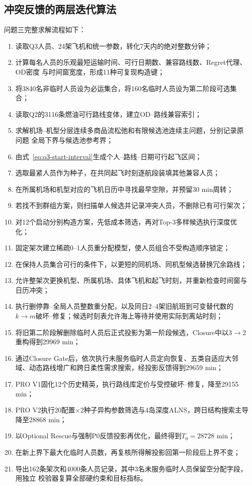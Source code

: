 \documentclass[UTF8,a4paper,zihao=5]{ctexart}
\begin{document}
\subsection{冲突反馈的两层迭代算法}

问题三完整求解流程如下：
\begin{enumerate}[label=\textbf{步骤\arabic*.},leftmargin=4.5em]
  \item 读取Q3人员、24架飞机和统一参数，转化7天内的绝对整数分钟；
  \item 计算每名人员的乐观最短运输时间、可行日期数、兼容路线数、Regret代理、OD密度
  与时间窗宽度，形成11种可复现构造键；
  \item 将3840名非临时人员设为必运集合，将160名临时人员设为第二阶段可选集合；
  \item 读取Q2的3116条燃油可行路线变体，建立OD--路线兼容索引；
  \item 求解机场--机型分层连续多商品流松弛和有限候选池连续主问题，分别记录原问题
  全局下界与候选池参考界；
  \item 由式~\eqref{eq:q3-start-interval}生成个人--路线--日期可行起飞区间；
  \item 选取最紧人员作为种子，在共同起飞时刻逐航段装填其他兼容人员；
  \item 在所属机场和机型对应的飞机日历中寻找最早空隙，并预留30 min周转；
  \item 若找不到群组方案，则扫描单人候选并记录冲突人员，不删除已有可行架次；
  \item 对12个启动分别构造方案，先低成本筛选，再对Top-$3$多样候选执行深度优化；
  \item 固定架次建立稀疏0--1人员重分配模型，使人员组合不受构造顺序锁定；
  \item 在保持人员集合可行的条件下，以更短的同机场、同机型候选替换冗余路线；
  \item 允许整架次更换机型、所属机场、具体飞机和起飞时刻，并重新检查时间窗与日历冲突；
  \item 执行删停靠--全局人员整数重分配，以及同日2--4架旧航班到可变替代数的
  $k\to m$破坏--修复；候选时刻表允许海上等待并使用实际到离站时刻；
  \item 将旧第二阶段解删除临时人员后正式投影为第一阶段候选，Closure中以$3\to2$重构得到29969 min；
  \item 通过Closure Gate后，依次执行未服务临时人员定向恢复、五类自适应大邻域、动态路线增广和跨日柔性需求搜索，经投影反馈得到29659 min；
  \item PRO V1固化12个历史精英，执行路线库定价与受控破坏--修复，降至29155 min；
  \item PRO V2执行20配置$\times$2种子异构参数筛选与4岛深度ALNS，跨日结构搜索主导降至28868 min；
  \item 以Optional Rescue与强制P0反馈投影再优化，最终得到$T_0=28728$ min；
  \item 在新上界下最大化临时人员数，再复核所得解投影回第一阶段后上界不变；
  \item 导出162条架次和4000条人员记录，其中3名未服务临时人员保留空分配字段，用独立
  校验器复算全部硬约束和目标指标。
\end{enumerate}
\end{document}
